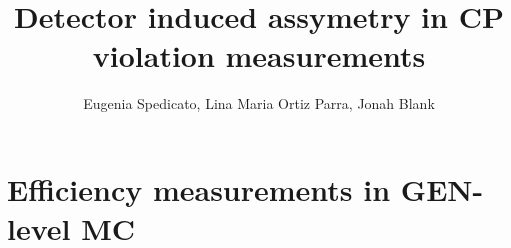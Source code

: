 \documentclass[11pt]{beamer}
\author{Eugenia Spedicato, Lina Maria Ortiz Parra, Jonah Blank}
\title{Detector induced assymetry in CP violation measurements}
\begin{document}
\begin{frame}
\titlepage
\end{frame}

\begin{frame}
\tableofcontents
\end{frame}
\section*{Efficiency measurements in GEN-level MC}
\end{document}
